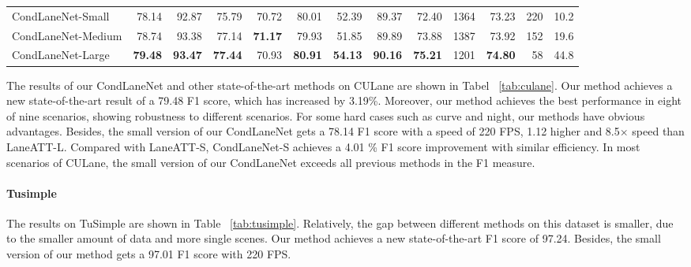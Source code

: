 \documentclass[10pt,twocolumn,letterpaper]{article}
\begin{document}
\begin{table*}[!b]
{\begin{tabular}{lrrrrrrrrrrrr}
\hline
CondLaneNet-Small & 78.14 & 92.87& 75.79 & 70.72 & 80.01 & 52.39 & 89.37 & 72.40 & 1364 & 73.23 & 220 & 10.2      \\
CondLaneNet-Medium & 78.74 & 93.38 & 77.14 &  \textbf{71.17} & 79.93 &  51.85 & 89.89 &  73.88 & 1387 & 73.92 & 152 & 19.6     \\
CondLaneNet-Large &  \textbf{79.48} &  \textbf{93.47} &  \textbf{77.44} & 70.93 &  \textbf{80.91} & \textbf{54.13} & \textbf{90.16} & \textbf{75.21} & 1201 &  \textbf{74.80} & 58 & 44.8      \\
\hline
\end{tabular}}
\caption{Comparison of different methods on CULane.}
\label{tab:culane}
\end{table*}
The results of our CondLaneNet and other state-of-the-art methods on CULane are shown in Tabel ~\ref{tab:culane}. Our method achieves a new state-of-the-art result of a 79.48 F1 score, which has increased by 3.19\%. Moreover, our method achieves the best performance in eight of nine scenarios, showing robustness to different scenarios. For some hard cases such as curve and night, our methods have obvious advantages. Besides, the small version of our CondLaneNet gets a 78.14 F1 score with a speed of 220 FPS, 1.12 higher and 8.5\(\times\) speed than LaneATT-L. Compared with LaneATT-S, CondLaneNet-S achieves a 4.01 \% F1 score improvement with similar efficiency. In most scenarios of CULane, the small version of our CondLaneNet exceeds all previous methods in the F1 measure.

\paragraph{Tusimple}
The results on TuSimple are shown in Table ~\ref{tab:tusimple}. Relatively, the gap between different methods on this dataset is smaller, due to the smaller amount of data and more single scenes. Our method achieves a new state-of-the-art F1 score of 97.24. Besides, the small version of our method gets a 97.01 F1 score with 220 FPS.
\end{document}
